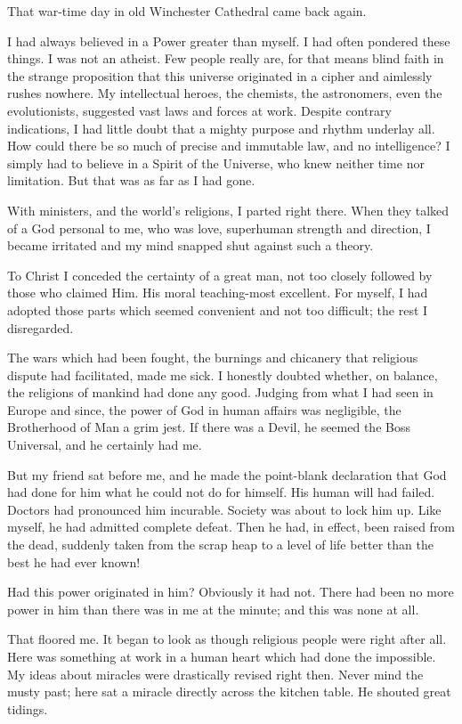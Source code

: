 \begin{biblechatper}
\begin{biblechatper}
\begin{biblechatper}
\begin{biblechatper}
\begin{biblechatper}
\begin{biblechatper}
\begin{biblechatper}
That war-time day in old Winchester Cathedral came back again.

I had always believed in a Power greater than myself.
I had often pondered these things.
I was not an atheist.
Few people really are, for that means blind faith in the strange proposition that this universe originated in a cipher and aimlessly rushes nowhere.
My intellectual heroes, the chemists, the astronomers, even the evolutionists, suggested vast laws and forces at work.
Despite contrary indications, I had little doubt that a mighty purpose and rhythm underlay all.
How could there be so much of precise and immutable law, and no intelligence?
I simply had to believe in a Spirit of the Universe, who knew neither time nor limitation.
But that was as far as I had gone.

With ministers, and the world's religions, I parted right there.
When they talked of a God personal to me, who was love, superhuman strength and direction, I became irritated and my mind snapped shut against such a theory.

To Christ I conceded the certainty of a great man, not too closely followed by those who claimed Him.
His moral teaching-most excellent.
For myself, I had adopted those parts which seemed convenient and not too difficult;
the rest I disregarded.

The wars which had been fought, the burnings and chicanery that religious dispute had facilitated, made me sick.
I honestly doubted whether, on balance, the religions of mankind had done any good.
Judging from what I had seen in Europe and since, the power of God in human affairs was negligible, the Brotherhood of Man a grim jest.
If there was a Devil, he seemed the Boss Universal, and he certainly had me.

But my friend sat before me, and he made the point-blank declaration that God had done for him what he could not do for himself.
His human will had failed.
Doctors had pronounced him incurable.
Society was about to lock him up.
Like myself, he had admitted complete defeat.
Then he had, in effect, been raised from the dead, suddenly taken from the scrap heap to a level of life better than the best he had ever known!

Had this power originated in him?
Obviously it had not.
There had been no more power in him than there was in me at the minute; and this was none at all.

That floored me.
It began to look as though religious people were right after all.
Here was something at work in a human heart which had done the impossible.
My ideas about miracles were drastically revised right then.
Never mind the musty past; here sat a miracle directly across the kitchen table.
He shouted great tidings.


\end{biblechatper}
\end{biblechatper}
\end{biblechatper}
\end{biblechatper}
\end{biblechatper}
\end{biblechatper}
\end{biblechatper}
